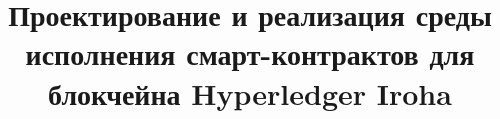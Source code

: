 \documentclass[12pt,a4paper]{article}
\begin{document}
\title{Проектирование и реализация среды исполнения смарт-контрактов для блокчейна Hyperledger Iroha}
\date{}
\author{}
\maketitle
\thispagestyle{empty}











\end{document}
